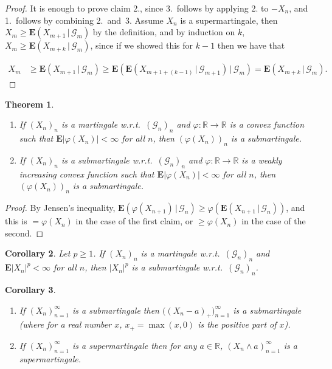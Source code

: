 \documentclass[11pt]{report}
\newcommand{\R}{\mathbb{R}}
\theoremstyle{plain}
\newtheorem{thm}{Theorem}[chapter]
\newtheorem{cor}[thm]{Corollary}
\theoremstyle{definition}
\begin{document}
\begin{proof}
It is enough to prove claim 2., since 3.\ follows by applying 2. to $-X_n$, and 1.~follows by combining 2.~and~3. Assume $X_n$ is a supermartingale, then $X_m\ge \mathbf{E}\left(X_{m+1}\,|\,\mathcal{G}_m\right)$ by the definition, and by induction on $k$, $X_m\ge \mathbf{E}\left(X_{m+k}\,|\,\mathcal{G}_m\right)$, since if we showed this for $k-1$ then we have that

\begin{align*}
X_m &\ge \mathbf{E}\left(X_{m+1}\,|\,\mathcal{G}_m\right)
\ge \mathbf{E}\left(\mathbf{E}\left(X_{m+1+(k-1)}\,|\,\mathcal{G}_{m+1}\right)\,|\,\mathcal{G}_m\right)
= \mathbf{E}\left(X_{m+k}\,|\,\mathcal{G}_m\right).
\end{align*}

\end{proof}

\begin{thm}

\begin{enumerate}[label=\arabic*.]
\item If $(X_n)_n$ is a martingale w.r.t.\ $(\mathcal{G}_n)_n$ and $\varphi:\R\to\R$ is a convex function such that $\mathbf{E}|\varphi(X_n)|<\infty$ for all $n$, then $(\varphi(X_n))_n$ is a submartingale.
\item If $(X_n)_n$ is a submartingale w.r.t.\ $(\mathcal{G}_n)_n$ and $\varphi:\R\to\R$ is a weakly increasing convex function such that $\mathbf{E}|\varphi(X_n)|<\infty$ for all $n$, then $(\varphi(X_n))_n$ is a submartingale.
\end{enumerate}

\end{thm}

\begin{proof}
By Jensen's inequality, $\mathbf{E}\left(\varphi(X_{n+1})\,|\,\mathcal{G}_n\right) \ge \varphi\left(\mathbf{E}\left(X_{n+1}\,|\,\mathcal{G}_n\right)\right)$, and this is $= \varphi(X_n)$ in the case of the first claim, or $\ge \varphi(X_n)$ in the case of the second.
\end{proof}

\begin{cor}
Let $p\ge 1$. If $(X_n)_n$ is a martingale w.r.t.\ $(\mathcal{G}_n)_n$ and $\mathbf{E}|X_n|^p<\infty$ for all $n$, then $|X_n|^p$ is a submartingale w.r.t.\ $(\mathcal{G}_n)_n$.
\end{cor}

\begin{cor}
\label{cor-positive-part}

\begin{enumerate}[label=\arabic*.]
\item If $(X_n)_{n=1}^\infty$ is a submartingale then $\big((X_n-a)_+\big)_{n=1}^\infty$ is a submartingale (where for a real number $x$, $x_+ = \max(x,0)$ is the positive part of $x$).
\item If $(X_n)_{n=1}^\infty$ is a supermartingale then for any $a\in\R$, $(X_n\wedge a)_{n=1}^\infty$ is a supermartingale.
\end{enumerate}

\end{cor}
\end{document}
